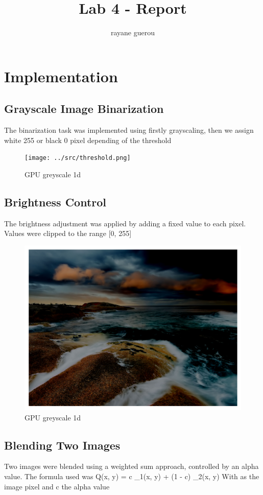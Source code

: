 \documentclass[a4paper]{article}
\title{Lab 4 - Report}
\author{rayane guerou}
\begin{document}
\maketitle


\section{Implementation}
\subsection{Grayscale Image Binarization}
The binarization task was implemented using firstly grayscaling, then we assign white 255 or black 0 pixel depending of the threshold

\begin{figure}[h!]
    \centering
    \texttt{[image: ../src/threshold.png]}
    \caption{GPU greyscale 1d}
\end{figure}

\subsection{Brightness Control}
The brightness adjustment was applied by adding a fixed value to each pixel. Values were clipped to the range [0, 255]

\begin{figure}[h!]
    \centering
    \includegraphics[scale=0.5]{../src/brightness.png}
    \caption{GPU greyscale 1d}
\end{figure}

\subsection{Blending Two Images}
Two images were blended using a weighted sum approach, controlled by an alpha value. The formula used was Q(x, y) = c \times \Phi_1(x, y) + (1 - c) \times \Phi_2(x, y)
With \Phi as the image pixel and c the alpha value
\end{document}
